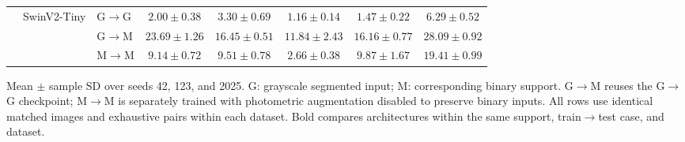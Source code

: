 \begin{table}[!t]
\begin{tabular*}{\textwidth}{@{\extracolsep{\fill}}lllccccc@{}}
\cmidrule(lr){2-8}
 & \multirow{3}{*}{SwinV2-Tiny} & G$\to$G & $2.00\pm0.38$ & {\boldmath $3.30\pm0.69$} & {\boldmath $1.16\pm0.14$} & {\boldmath $1.47\pm0.22$} & {\boldmath $6.29\pm0.52$} \\
 &  & G$\to$M & $23.69\pm1.26$ & $16.45\pm0.51$ & $11.84\pm2.43$ & $16.16\pm0.77$ & $28.09\pm0.92$ \\
 &  & M$\to$M & $9.14\pm0.72$ & $9.51\pm0.78$ & $2.66\pm0.38$ & $9.87\pm1.67$ & $19.41\pm0.99$ \\
\bottomrule
\end{tabular*}
\par\vspace{3pt}
\begin{minipage}{\textwidth}\footnotesize
Mean $\pm$ sample SD over seeds 42, 123, and 2025. G: grayscale segmented input; M: corresponding binary support.
G$\to$M reuses the G$\to$G checkpoint; M$\to$M is separately trained with photometric augmentation disabled to preserve binary inputs.
All rows use identical matched images and exhaustive pairs within each dataset. Bold compares architectures within the same support, train$\to$test case, and dataset.
\end{minipage}
\endgroup
\end{table}

